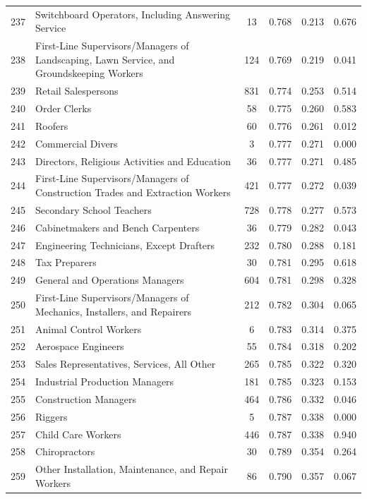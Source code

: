 {\begin{longtable}{llcccc}
 237 & Switchboard Operators, Including Answering Service & 13 & 0.768 & 0.213 & 0.676 \\
 238 & First-Line Supervisors/Managers of Landscaping, Lawn Service, and Groundskeeping Workers & 124 & 0.769 & 0.219 & 0.041 \\
 239 & Retail Salespersons & 831 & 0.774 & 0.253 & 0.514 \\
 240 & Order Clerks & 58 & 0.775 & 0.260 & 0.583 \\
 241 & Roofers & 60 & 0.776 & 0.261 & 0.012 \\
 242 & Commercial Divers & 3 & 0.777 & 0.271 & 0.000 \\
 243 & Directors, Religious Activities and Education & 36 & 0.777 & 0.271 & 0.485 \\
 244 & First-Line Supervisors/Managers of Construction Trades and Extraction Workers & 421 & 0.777 & 0.272 & 0.039 \\
 245 & Secondary School Teachers & 728 & 0.778 & 0.277 & 0.573 \\
 246 & Cabinetmakers and Bench Carpenters & 36 & 0.779 & 0.282 & 0.043 \\
 247 & Engineering Technicians, Except Drafters & 232 & 0.780 & 0.288 & 0.181 \\
 248 & Tax Preparers & 30 & 0.781 & 0.295 & 0.618 \\
 249 & General and Operations Managers & 604 & 0.781 & 0.298 & 0.328 \\
 250 & First-Line Supervisors/Managers of Mechanics, Installers, and Repairers & 212 & 0.782 & 0.304 & 0.065 \\
 251 & Animal Control Workers & 6 & 0.783 & 0.314 & 0.375 \\
 252 & Aerospace Engineers & 55 & 0.784 & 0.318 & 0.202 \\
 253 & Sales Representatives, Services, All Other & 265 & 0.785 & 0.322 & 0.320 \\
 254 & Industrial Production Managers & 181 & 0.785 & 0.323 & 0.153 \\
 255 & Construction Managers & 464 & 0.786 & 0.332 & 0.046 \\
 256 & Riggers & 5 & 0.787 & 0.338 & 0.000 \\
 257 & Child Care Workers & 446 & 0.787 & 0.338 & 0.940 \\
 258 & Chiropractors & 30 & 0.789 & 0.354 & 0.264 \\
 259 & Other Installation, Maintenance, and Repair Workers & 86 & 0.790 & 0.357 & 0.067 \\

\end{longtable}}
